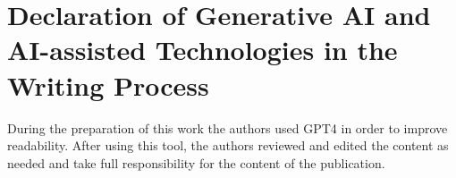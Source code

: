 \section*{Declaration of Generative AI and AI-assisted Technologies in the Writing Process}
During the preparation of this work the authors used GPT4 in order to improve readability. After using this tool, the authors reviewed and edited the content as needed and take full responsibility for the content of the publication.